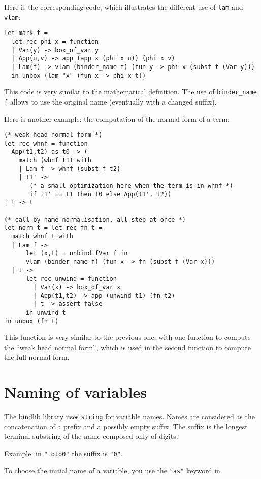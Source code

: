 \documentclass[11pt]{article}
\begin{document}
Here is the corresponding code, which illustrates the different use
of \verb#lam# and \verb#vlam#:

\begin{verbatim}
let mark t =
  let rec phi x = function
  | Var(y) -> box_of_var y
  | App(u,v) -> app (app x (phi x u)) (phi x v)
  | Lam(f) -> vlam (binder_name f) (fun y -> phi x (subst f (Var y)))
  in unbox (lam "x" (fun x -> phi x t))
\end{verbatim}

This code is very similar to the mathematical definition.
The use of \verb#binder_name f# allows to use the original name
(eventually with a changed suffix).

Here is another example: the computation of the normal form of a term:

\begin{verbatim}
(* weak head normal form *)
let rec whnf = function
  App(t1,t2) as t0 -> (
    match (whnf t1) with
    | Lam f -> whnf (subst f t2)
    | t1' ->
       (* a small optimization here when the term is in whnf *)
       if t1' == t1 then t0 else App(t1', t2))
| t -> t

(* call by name normalisation, all step at once *)
let norm t = let rec fn t =
  match whnf t with
  | Lam f ->
      let (x,t) = unbind fVar f in
      vlam (binder_name f) (fun x -> fn (subst f (Var x)))
  | t ->
      let rec unwind = function
        | Var(x) -> box_of_var x
        | App(t1,t2) -> app (unwind t1) (fn t2)
        | t -> assert false
      in unwind t
in unbox (fn t)
\end{verbatim}

This function is very similar to the previous one, with one function
to compute the ``weak head normal form'', which is used in the second
function to compute the full normal form.

\section{Naming of variables}

The bindlib library uses \verb#string# for variable names. Names are
considered
as the concatenation of a prefix and a possibly empty suffix. The
suffix is the longest terminal substring of the name composed only of
digits.

Example: in \verb#"toto0"# the suffix is \verb#"0"#.

To choose the initial name of a variable, you use the \verb#"as"#
keyword in
\end{document}
